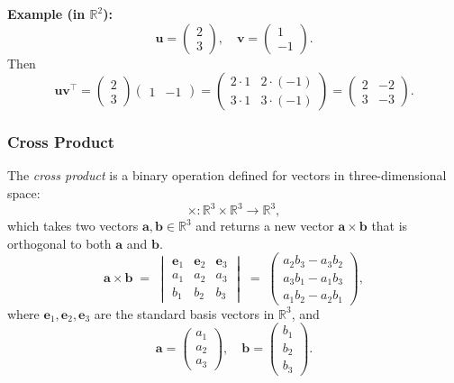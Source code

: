 \noindent
\textbf{Example (in $\mathbb{R}^2$):}
\[
\mathbf{u} = \begin{pmatrix} 2 \\ 3 \end{pmatrix}, 
\quad
\mathbf{v} = \begin{pmatrix} 1 \\ -1 \end{pmatrix}.
\]
Then
\[
\mathbf{u}\mathbf{v}^\top 
= 
\begin{pmatrix} 2 \\ 3 \end{pmatrix}
\begin{pmatrix} 1 & -1 \end{pmatrix}
= 
\begin{pmatrix}
2 \cdot 1 & 2 \cdot (-1) \\
3 \cdot 1 & 3 \cdot (-1)
\end{pmatrix}
= 
\begin{pmatrix}
2 & -2 \\
3 & -3
\end{pmatrix}.
\]

\subsubsection{Cross Product}
The \emph{cross product} is a binary operation defined for vectors in three-dimensional space:
\[
\times : \mathbb{R}^3 \times \mathbb{R}^3 \to \mathbb{R}^3,
\]
which takes two vectors $\mathbf{a}, \mathbf{b} \in \mathbb{R}^3$ and returns a new vector $\mathbf{a} \times \mathbf{b}$ 
that is orthogonal to both $\mathbf{a}$ and $\mathbf{b}$.
\[
\mathbf{a} \times \mathbf{b} 
\;=\; 
\begin{vmatrix}
\mathbf{e}_1 & \mathbf{e}_2 & \mathbf{e}_3 \\
a_1 & a_2 & a_3 \\
b_1 & b_2 & b_3 
\end{vmatrix}
\;=\;
\begin{pmatrix}
a_2 b_3 - a_3 b_2 \\
a_3 b_1 - a_1 b_3 \\
a_1 b_2 - a_2 b_1
\end{pmatrix},
\]
where $\mathbf{e}_1, \mathbf{e}_2, \mathbf{e}_3$ are the standard basis vectors in $\mathbb{R}^3$, 
and
\[
\mathbf{a} 
= \begin{pmatrix} a_1 \\ a_2 \\ a_3 \end{pmatrix},
\quad
\mathbf{b} 
= \begin{pmatrix} b_1 \\ b_2 \\ b_3 \end{pmatrix}.
\]

